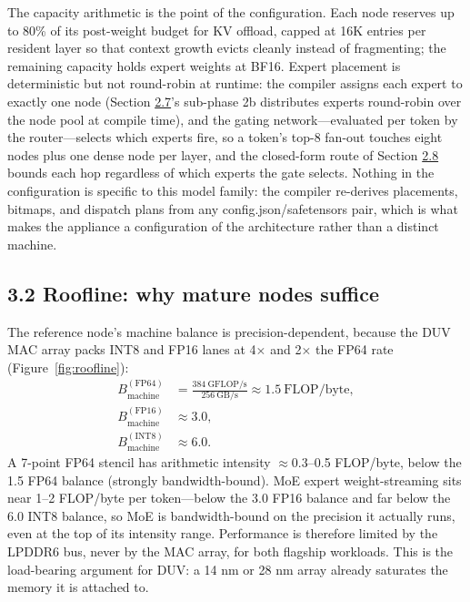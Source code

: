 \documentclass[12pt,onecolumn]{article}
\begin{document}
The capacity arithmetic is the point of the configuration. Each node reserves up to 80\% of its post-weight budget for KV offload, capped at 16K entries per resident layer so that context growth evicts cleanly instead of fragmenting; the remaining capacity holds expert weights at BF16. Expert placement is deterministic but not round-robin at runtime: the compiler assigns each expert to exactly one node (Section \hyperref[sec:2.7]{2.7}'s sub-phase 2b distributes experts round-robin over the node pool at compile time), and the gating network---evaluated per token by the router---selects which experts fire, so a token's top-8 fan-out touches eight nodes plus one dense node per layer, and the closed-form route of Section \hyperref[sec:2.8]{2.8} bounds each hop regardless of which experts the gate selects. Nothing in the configuration is specific to this model family: the compiler re-derives placements, bitmaps, and dispatch plans from any config.json/safetensors pair, which is what makes the appliance a configuration of the architecture rather than a distinct machine.

\subsection*{3.2 Roofline: why mature nodes suffice}\label{sec:3.2}

The reference node's machine balance is precision-dependent, because the DUV MAC array packs INT8 and FP16 lanes at 4$\times$ and 2$\times$ the FP64 rate (Figure~\ref{fig:roofline}):
$$
\begin{aligned}
B_{\mathrm{machine}}^{(\mathrm{FP64})} &= \frac{384\ \mathrm{GFLOP/s}}{256\ \mathrm{GB/s}} \approx 1.5\ \mathrm{FLOP/byte},\\
B_{\mathrm{machine}}^{(\mathrm{FP16})} &\approx 3.0,\\
B_{\mathrm{machine}}^{(\mathrm{INT8})} &\approx 6.0.
\end{aligned}
$$
A 7-point FP64 stencil has arithmetic intensity $\approx$0.3--0.5 FLOP/byte, below the 1.5 FP64 balance (strongly bandwidth-bound)\cite{5}. MoE expert weight-streaming sits near 1--2 FLOP/byte per token---below the 3.0 FP16 balance and far below the 6.0 INT8 balance, so MoE is bandwidth-bound on the precision it actually runs, even at the top of its intensity range. Performance is therefore limited by the LPDDR6 bus, never by the MAC array, for both flagship workloads. This is the load-bearing argument for DUV: a 14 nm or 28 nm array already saturates the memory it is attached to.
\end{document}

